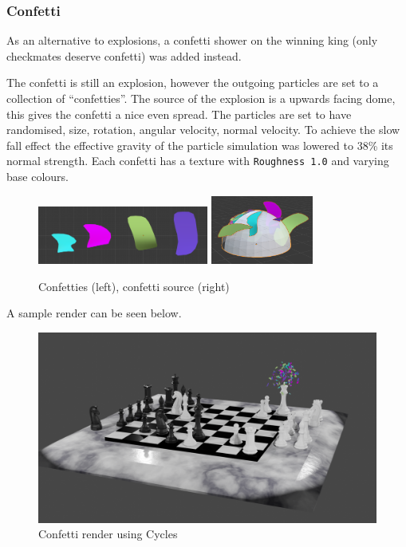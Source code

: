 \documentclass[11pt]{article}
\begin{document}
\subsubsection{Confetti}
\label{sec:orgaaac7db}
As an alternative to explosions, a confetti shower on the winning king (only
checkmates deserve confetti) was added instead.

The confetti is still an explosion, however the outgoing particles are set to a
collection of ``confetties''. The source of the explosion is a upwards facing
dome, this gives the confetti a nice even spread. The particles are set to have
randomised, size, rotation, angular velocity, normal velocity. To achieve the
slow fall effect the effective gravity of the particle simulation was lowered to
38\% its normal strength. Each confetti has a texture with \texttt{Roughness 1.0} and
varying base colours.

\begin{figure}[htbp]
\begin{center}
\includegraphics[width=0.5\textwidth]{Images/confetties.png}
\includegraphics[width=0.3\textwidth]{Images/confetti dome.png}
\end{center}
\caption{Confetties (left), confetti source (right)}
\end{figure}

A sample render can be seen below.
\begin{figure}[htbp]
\centering
\includegraphics[width=\textwidth]{Images/Confetti! cycles.png}
\caption{Confetti render using Cycles}
\end{figure}
\end{document}
